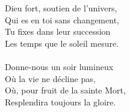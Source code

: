 Dieu fort, soutien de l’univers,\\
Qui es en toi sans changement,\\
Tu fixes dans leur succession\\
Les temps que le soleil mesure.\\
\\
Donne-nous un soir lumineux\\
Où la vie ne décline pas,\\
Où, pour fruit de la sainte Mort,\\
Resplendira toujours la gloire.